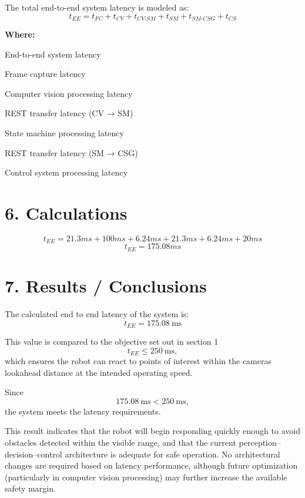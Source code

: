 \documentclass[11pt]{article}
\begin{document}
\vspace{1em}


The total end-to-end system latency is modeled as:
\[
t_{EE} = t_{FC} + t_{CV} + t_{CV\text{-}SM} + t_{SM} + t_{SM\text{-}CSG} + t_{CS}
\]

\noindent\textbf{Where:}
\begin{description}[leftmargin=3cm, style=nextline]
    \item[$t_{EE}$] End-to-end system latency
    \item[$t_{FC}$] Frame capture latency
    \item[$t_{CV}$] Computer vision processing latency
    \item[$t_{CV\text{-}SM}$] REST transfer latency (CV → SM)
    \item[$t_{SM}$] State machine processing latency
    \item[$t_{SM\text{-}CSG}$] REST transfer latency (SM → CSG)
    \item[$t_{CS}$] Control system processing latency
\end{description}

\vspace{1em}

\section*{6. Calculations}
\[
t_{EE} = 21.3 ms + 100 ms + 6.24 ms + 21.3 ms + 6.24 ms + 20 ms
\]
\[
t_{EE} = 175.08 ms
\]

\vspace{1em}

\section*{7. Results / Conclusions}
The calculated end to end latency of the system is:
\[
t_{EE} = 175.08\ \text{ms}
\]

This value is compared to the objective set out in section 1
\[
t_{EE} \leq 250\ \text{ms},
\]
which ensures the robot can react to points of interest within the cameras lookahead distance at the intended operating speed.

Since 
\[
175.08\ \text{ms} < 250\ \text{ms},
\]
the system meets the latency requirements.

This result indicates that the robot will begin responding quickly enough to avoid obstacles detected within the visible range, and that the current perception–decision–control architecture is adequate for safe operation. No architectural changes are required based on latency performance, although future optimization (particularly in computer vision processing) may further increase the available safety margin.

\vspace{1em}
\end{document}
